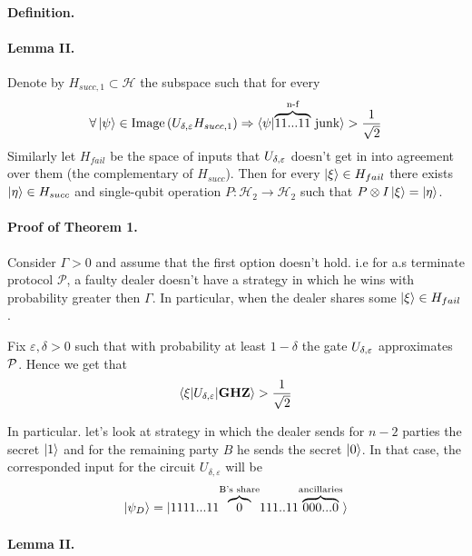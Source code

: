 \documentclass{article}
\begin{document}
\paragraph{Definition.} 

\paragraph{Lemma II.} Denote by \( H_{succ,1} \subset \mathcal{H} \) the subspace such that for every \begin{equation*}
    \forall \ket{\psi} \in \text{Image} \left( U_{\delta,\varepsilon } H_{succ,1} \right) \Rightarrow  \braket{\psi|\overset{\text{n-f}}{\overbrace{11...11}}\text{ junk}} > \frac{1}{\sqrt{2}}
\end{equation*}  Similarly let \( H_{fail} \) be the space of inputs that \( U_{\delta,\varepsilon } \) doesn't get in into agreement over them (the complementary of \( H_{succ} \)). Then for every \( \ket{ \xi} \in H_{fail} \)  there exists \( \ket{\eta} \in H_{succ} \) and single-qubit operation \( P : \mathcal{H}_2 \rightarrow \mathcal{H}_2 \) such that \( P \otimes I \ket{\xi} =\ket{\eta} \).   

\paragraph{Proof of Theorem 1.} Consider \( \Gamma > 0 \) and assume that the first option doesn't hold. i.e for a.s terminate protocol \( \mathcal{P} \), a faulty dealer doesn't have a strategy in which he wins with probability greater then \( \Gamma \). In particular, when the dealer shares some \( \ket{ \xi} \in H_{fail} \).

Fix \(\varepsilon, \delta > 0\) such that with probability at least \(1-\delta\) the gate \( U_{\delta,\varepsilon } \) approximates \( \mathcal{P} \). Hence we get that  \begin{equation*}
    \braket{ \xi | U_{\delta,\varepsilon } | \mathbf{GHZ}} > \frac{1}{\sqrt{2}} 
\end{equation*} 


In particular. let's look at strategy in which the dealer sends for \( n-2 \) parties the secret \( \ket{1} \) and for the remaining party \(B\) he sends the secret \( \ket{0}\). In that case, the corresponded input for the circuit \( U_{\delta, \varepsilon} \) will be
\begin{equation*}
    \ket{\psi_{D}} = \ket{1111...11\overset{\text{B's share}}{\overbrace{0}}111..11\overset{\text{ancillaries}}{\overbrace{000...0}}}
\end{equation*}


\paragraph{Lemma II.}
\end{document}

